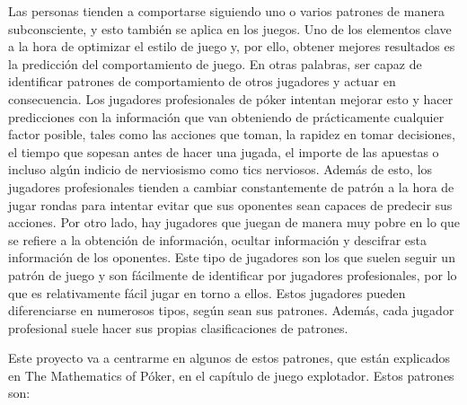 Las personas tienden a comportarse siguiendo uno o varios patrones de manera subconsciente, y esto también se aplica en los juegos. 
Uno de los elementos clave a la hora de optimizar el estilo de juego y, por ello, obtener mejores resultados es la predicción del comportamiento de juego. En otras palabras, ser capaz de identificar patrones de comportamiento de otros jugadores y actuar en consecuencia.
Los jugadores profesionales de póker intentan mejorar esto y hacer predicciones con la información que van obteniendo de prácticamente cualquier factor posible, tales como las acciones que toman, la rapidez en tomar decisiones, el tiempo que sopesan antes de hacer una jugada, el importe de las apuestas o incluso algún indicio de nerviosismo como tics nerviosos.
Además de esto, los jugadores profesionales tienden a cambiar constantemente de patrón a la hora de jugar rondas para intentar evitar que sus oponentes sean capaces de predecir sus acciones.
Por otro lado, hay jugadores que juegan de manera muy pobre en lo que se refiere a la obtención de información, ocultar información y descifrar esta información de los oponentes. Este tipo de jugadores son los que suelen seguir un patrón de juego y son fácilmente de identificar por jugadores profesionales, por lo que es relativamente fácil jugar en torno a ellos. 
Estos jugadores pueden diferenciarse en numerosos tipos, según sean sus patrones. Además, cada jugador profesional suele hacer sus propias clasificaciones de patrones. 

Este proyecto va a centrarme en algunos de estos patrones, que están explicados en The Mathematics of Póker\cite{chen}, en el capítulo de juego explotador. 
Estos patrones son:

